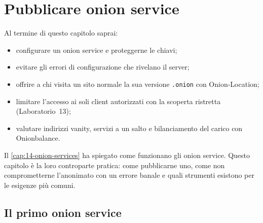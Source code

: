 \chapter{Pubblicare onion service}\label{cap:21-onion-pratica}

\begin{obiettivi}
Al termine di questo capitolo saprai:
\begin{itemize}[nosep]
  \item configurare un onion service e proteggerne le chiavi;
  \item evitare gli errori di configurazione che rivelano il server;
  \item offrire a chi visita un sito normale la sua versione \texttt{.onion} con Onion-Location;
  \item limitare l'accesso ai soli client autorizzati con la scoperta ristretta (Laboratorio~13);
  \item valutare indirizzi vanity, servizi a un salto e bilanciamento del carico con Onionbalance.
\end{itemize}
\end{obiettivi}

Il \cref{cap:14-onion-services} ha spiegato come funzionano gli onion service. Questo capitolo è la loro controparte pratica: come pubblicarne uno, come non comprometterne l'anonimato con un errore banale e quali strumenti esistono per le esigenze più comuni.

\section{Il primo onion service}\label{sec:onionp-primo}

